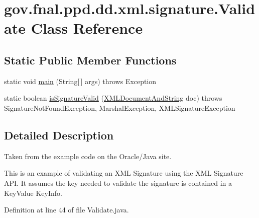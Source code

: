\hypertarget{classgov_1_1fnal_1_1ppd_1_1dd_1_1xml_1_1signature_1_1Validate}{\section{gov.\-fnal.\-ppd.\-dd.\-xml.\-signature.\-Validate Class Reference}
\label{classgov_1_1fnal_1_1ppd_1_1dd_1_1xml_1_1signature_1_1Validate}
}
\subsection*{Static Public Member Functions}
\begin{DoxyCompactItemize}
\item 
static void \hyperlink{classgov_1_1fnal_1_1ppd_1_1dd_1_1xml_1_1signature_1_1Validate_abaf672a64ab32096e2f296b2543e13ab}{main} (String\mbox{[}$\,$\mbox{]} args)  throws Exception 
\item 
static boolean \hyperlink{classgov_1_1fnal_1_1ppd_1_1dd_1_1xml_1_1signature_1_1Validate_a9d0a0a1029bc2eeed35a10beb6ab3667}{is\-Signature\-Valid} (\hyperlink{classgov_1_1fnal_1_1ppd_1_1dd_1_1xml_1_1XMLDocumentAndString}{X\-M\-L\-Document\-And\-String} doc)  throws Signature\-Not\-Found\-Exception, Marshal\-Exception, X\-M\-L\-Signature\-Exception 
\end{DoxyCompactItemize}


\subsection{Detailed Description}
Taken from the example code on the Oracle/\-Java site.

This is an example of validating an X\-M\-L Signature using the X\-M\-L Signature A\-P\-I. It assumes the key needed to validate the signature is contained in a Key\-Value Key\-Info. 

Definition at line 44 of file Validate.\-java.



